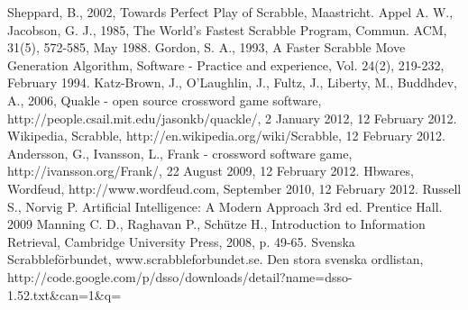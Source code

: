 \documentclass[a4paper, 12pt]{report}
\begin{document}
\begin{thebibliography}{100}  
   Sheppard, B., 2002, Towards Perfect Play of Scrabble, Maastricht.
   Appel A. W., Jacobson, G. J., 1985, The World’s Fastest Scrabble Program, Commun. ACM, 31(5), 572-585, May 1988.
 Gordon, S. A., 1993, A Faster Scrabble Move Generation Algorithm, Software - Practice and experience, Vol. 24(2), 219-232, February 1994.
 Katz-Brown, J., O’Laughlin, J., Fultz, J., Liberty, M., Buddhdev, A., 2006, Quakle - open source crossword game software, http://people.csail.mit.edu/jasonkb/quackle/, 2 January 2012,  12 February 2012.
 Wikipedia, Scrabble, http://en.wikipedia.org/wiki/Scrabble, 12 February 2012.
 Andersson, G., Ivansson, L., Frank - crossword software game, http://ivansson.org/Frank/, 22 August 2009, 12 February 2012.
 Hbwares, Wordfeud, http://www.wordfeud.com, September 2010, 12 February 2012.
 Russell S., Norvig P. Artificial Intelligence: A Modern Approach 3rd ed. Prentice Hall. 2009
 Manning C. D., Raghavan P., Schütze H., Introduction to Information Retrieval, Cambridge University Press, 2008, p. 49-65.
 Svenska Scrabbleförbundet, www.scrabbleforbundet.se.
Den stora svenska ordlistan, http://code.google.com/p/dsso/downloads/detail?name=dsso-1.52.txt\&can=1\&q=
\end{thebibliography}
\end{document}
